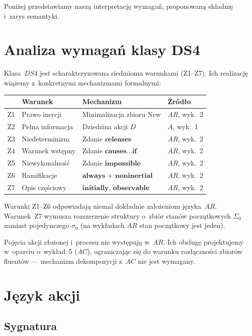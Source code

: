 \documentclass[11pt,a4paper]{article}
\newcommand{\causes}{\textbf{causes}}
\renewcommand{\iff}{\textbf{if}}
\newcommand{\initially}{\textbf{initially}}
\newcommand{\always}{\textbf{always}}
\newcommand{\impossible}{\textbf{impossible}}
\newcommand{\releases}{\textbf{releases}}
\newcommand{\noninertial}{\textbf{noninertial}}
\newcommand{\observable}{\textbf{observable}}
\newcommand{\New}{\mathrm{New}}
\begin{document}
Poniżej przedstawiamy naszą interpretację wymagań, proponowaną składnię
i~zarys semantyki.

\section{Analiza wymagań klasy DS4}

Klasa~$\mathit{DS4}$ jest scharakteryzowana siedmioma warunkami (Z1--Z7).
Ich realizację wiążemy z~konkretnymi mechanizmami formalnymi:

\begin{table}[h]
\centering
\begin{tabular}{clll}
\toprule
& \textbf{Warunek} & \textbf{Mechanizm} & \textbf{Źródło} \\
\midrule
Z1 & Prawo inercji & Minimalizacja zbioru $\New$ & $AR$, wyk.~2 \\
Z2 & Pełna informacja & Dziedzina akcji $D$ & $A$, wyk.~1 \\
Z3 & Niedeterminizm & Zdanie $\releases$ & $AR$, wyk.~2 \\
Z4 & Warunek wstępny & Zdanie $\causes \ldots \iff$ & $AR$, wyk.~2 \\
Z5 & Niewykonalność & Zdanie $\impossible$ & $AR$, wyk.~2 \\
Z6 & Ramifikacje & $\always$ + $\noninertial$ & $AR$, wyk.~2 \\
Z7 & Opis częściowy & $\initially$, $\observable$ & $AR$, wyk.~2 \\
\bottomrule
\end{tabular}
\end{table}

Warunki Z1--Z6 odpowiadają niemal dokładnie założeniom języka~$AR$.
Warunek~Z7 wymusza rozszerzenie struktury o~zbiór stanów początkowych $\Sigma_0$
zamiast pojedynczego $\sigma_0$ (na wykładach $AR$ stan początkowy jest jeden).

Pojęcia akcji złożonej i~procesu nie występują w~$AR$. Ich obsługę
projektujemy w~oparciu o~wykład~5 ($AC$), ograniczając się do warunku
rozłączności zbiorów fluentów --- mechanizm dekompozycji z~$AC$ nie jest
wymagany.

\section{Język akcji}

\subsection{Sygnatura}
\end{document}
